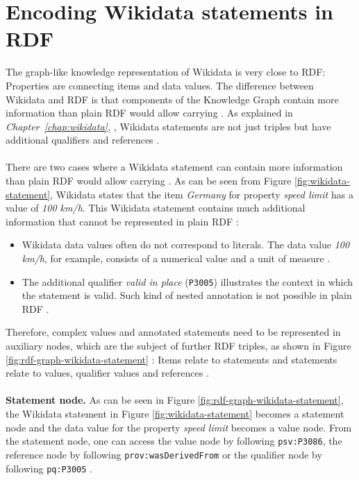 ﻿\documentclass[11pt,titlepage,oneside,openany]{book}
\begin{document}
\section{Encoding Wikidata statements in RDF}
The graph-like knowledge representation of Wikidata is very close to RDF: Properties are connecting items and data values. The difference between Wikidata and RDF is that components of the Knowledge Graph contain more information than plain RDF would allow carrying \cite{Malyshev2018GettingTM}. As explained in \textit{Chapter~\ref{chap:wikidata}, }, Wikidata statements are not just triples but have additional qualifiers and references \cite{Erxleben2014IntroducingWT}.
\\
\\
There are two cases where a Wikidata statement can contain more information than plain RDF would allow carrying \cite{Malyshev2018GettingTM}. As can be seen from Figure \ref{fig:wikidata-statement}, Wikidata states that the item \textit{Germany} for property \textit{speed limit} has a value of \textit{100 km/h}. This Wikidata statement contains much additional information that cannot be represented in plain RDF \cite{Malyshev2018GettingTM}:
\begin{itemize}
	\item Wikidata data values often do not correspond to literals. The data value \textit{100 km/h}, for example, consists of a numerical value and a unit of measure \cite{Malyshev2018GettingTM}. 
	\item The additional qualifier \textit{valid in place} (\texttt{P3005}) illustrates the context in which the statement is valid. Such kind of nested annotation is not possible in plain RDF \cite{Malyshev2018GettingTM}. 
\end{itemize}
Therefore, complex values and annotated statements need to be represented in auxiliary nodes, which are the subject of further RDF triples, as shown in Figure \ref{fig:rdf-graph-wikidata-statement} \cite{Malyshev2018GettingTM}: Items relate to statements and statements relate to values, qualifier values and references \cite{Erxleben2014IntroducingWT}.
\\
\\
\textbf{Statement node. }As can be seen in Figure \ref{fig:rdf-graph-wikidata-statement}, the Wikidata statement in Figure \ref{fig:wikidata-statement} becomes a statement node and the data value for the property \textit{speed limit} becomes a value node. From the statement node, one can access the value node by following \texttt{psv:P3086}, the reference node by following \texttt{prov:wasDerivedFrom} or the qualifier node by following \texttt{pq:P3005} \cite{Malyshev2018GettingTM}.
\end{document}

